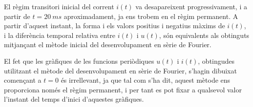 \begin{exemple}
    El règim transitori inicial del corrent $i(t)$ va desapareixent progressivament, i a partir de $t=\SI{20}{ms}$ aproximadament, ja ens trobem en el règim permanent.
    A partir d'aquest instant, la forma i els valors positius i negatius màxims de $i(t)$, i la diferència temporal relativa entre $i(t)$ i $u(t)$, són equivalents als obtinguts mitjançant el mètode inicial del desenvolupament en sèrie de Fourier.

    El fet que les gràfiques de les funcions periòdiques $u(t)$ i  $i(t)$, obtingudes utilitzant el mètode del desenvolupament en sèrie de Fourier, s'hagin dibuixat començant a $t=0$ és irrellevant, ja que tal com s'ha dit,   aquest mètode ens proporciona només el règim permanent, i per tant es pot fixar a qualsevol valor l'instant del temps d'inici d'aquestes gràfiques.
\end{exemple}

